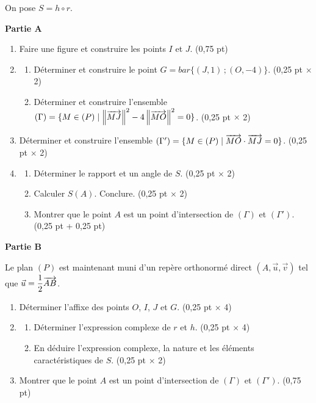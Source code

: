 On pose $S = h \circ r$.

\medskip
\noindent\textbf{Partie A}

\begin{enumerate}
	\item Faire une figure et construire les points $I$ et $J$. \hfill (0,75 pt)
	\item
	\begin{enumerate}
		\item Déterminer et construire le point $G = bar\{(J,1)\,;(O,-4)\}$. \hfill (0,25 pt $\times$ 2)
		\item Déterminer et construire l'ensemble $(\Gamma) = \{M \in (P) \mid \left\Vert \overrightarrow{MJ} \right\Vert^2 - 4\left\Vert \overrightarrow{MO} \right\Vert^2 = 0\}$. \hfill (0,25 pt $\times$ 2)
	\end{enumerate}
	\item Déterminer et construire l'ensemble $(\Gamma') = \{M \in (P) \mid \overrightarrow{MO} \cdot \overrightarrow{MJ} = 0\}$. \hfill (0,25 pt $\times$ 2)
	\item
	\begin{enumerate}
		\item Déterminer le rapport et un angle de $S$. \hfill (0,25 pt $\times$ 2)
		\item Calculer $S(A)$. Conclure. \hfill (0,25 pt $\times$ 2)
		\item Montrer que le point $A$ est un point d'intersection de $(\Gamma)$ et $(\Gamma')$. \hfill (0,25 pt + 0,25 pt)
	\end{enumerate}
\end{enumerate}

\medskip
\noindent\textbf{Partie B}

Le plan $(P)$ est maintenant muni d'un repère orthonormé direct $(A,\vec{u},\vec{v})$ tel que $\vec{u} = \dfrac{1}{2}\overrightarrow{AB}$.

\begin{enumerate}
	\item Déterminer l'affixe des points $O$, $I$, $J$ et $G$. \hfill (0,25 pt $\times$ 4)
	\item
	\begin{enumerate}
		\item Déterminer l'expression complexe de $r$ et $h$. \hfill (0,25 pt $\times$ 4)
		\item En déduire l'expression complexe, la nature et les éléments caractéristiques de $S$. \hfill (0,25 pt $\times$ 2)
	\end{enumerate}
	\item Montrer que le point $A$ est un point d'intersection de $(\Gamma)$ et $(\Gamma')$. \hfill (0,75 pt)
\end{enumerate}


